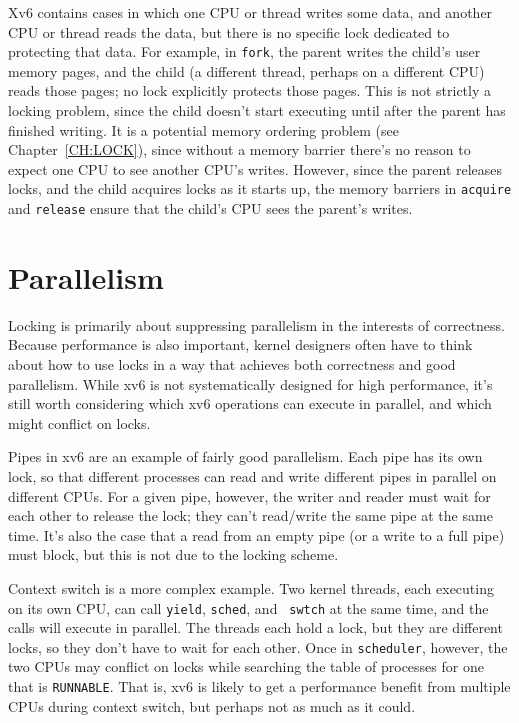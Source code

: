 Xv6 contains cases in which one CPU or thread writes some data, and
another CPU or thread reads the data, but there is no specific lock
dedicated to protecting that data. For example, in {\tt fork}, the
parent writes the child's user memory pages, and the child (a
different thread, perhaps on a different CPU) reads those pages; no
lock explicitly protects those pages. This is not strictly a locking
problem, since the child doesn't start executing until after the parent has
finished writing. It is a potential memory ordering problem
(see Chapter~\ref{CH:LOCK}), since without a memory barrier there's no
reason to expect one CPU to see another CPU's writes. However, since
the parent releases locks, and the child acquires locks as it starts
up, the memory barriers in {\tt acquire} and {\tt release}
ensure that the child's CPU sees the parent's writes.

\section{Parallelism}

Locking is primarily about suppressing parallelism in the interests of
correctness. Because performance is also important, kernel designers
often have to think about how to use locks in a way that achieves both
correctness and good parallelism. While xv6 is not systematically
designed for high performance, it's still worth considering which xv6
operations can execute in parallel, and which might conflict on locks.

Pipes in xv6 are an example of fairly good parallelism. Each pipe has
its own lock, so that different processes can read and write 
different pipes in parallel on different CPUs. For a given pipe,
however, the writer and reader must wait for each other to release the
lock; they can't read/write the same pipe at the same time. It's also
the case that a read from an empty pipe (or a write to a full pipe)
must block, but this is not due to the locking scheme.

Context switch is a more complex example. Two kernel threads, each
executing on its own CPU, can call {\tt yield}, {\tt sched}, and {\tt
  swtch} at the same time, and the calls will execute in parallel. The
threads each hold a lock, but they are different locks, so they don't
have to wait for each other. Once in {\tt scheduler}, however, the two
CPUs may conflict on locks while searching the table of processes for
one that is {\tt RUNNABLE}. That is, xv6 is likely to get a
performance benefit from multiple CPUs during context switch, but
perhaps not as much as it could.

